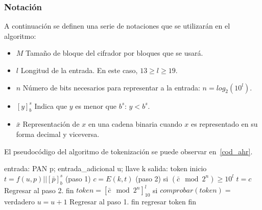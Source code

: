 \subsubsection{Notación}
A continuación se definen una serie de notaciones que se utilizarán en el
algoritmo:
\begin{itemize}
  \item $ M $ Tamaño de bloque del cifrador por bloques que se usará.
  \item $ l $ Longitud de la entrada. En este caso, $13 \geq l \geq 19$.
  \item $ n $ Número de bits necesarios para representar a la entrada:
    $n = log_2(10^l)$.
  \item $ [y]^s_b $ Indica que $y$ es menor que $b^s$: $y < b^s$.
  \item $\bar{x}$ Representación de $x$ en una cadena binaria cuando $x$ es
    representado en su forma decimal y viceversa.
\end{itemize}


El pseudocódigo del algoritmo de tokenización se puede observar en~\ref{cod_ahr}.
\begin{pseudocodigo}[%
    caption={Híbrido reversible, método de tokenización},
    label{cod_ahr}%
  ]
    entrada: PAN p; entrada_adicional u; llave k
    salida:  token
    inicio
      $t = f(u, p) || [\bar{p}]^s_b$ (paso 1)
      $c = E(k, t)$ (paso 2)
      si $(\bar{c} \mod 2^n) \geq 10^l$
        $t = c$
        Regresar al paso 2.
      fin
      $token = {[\bar{c} \mod 2^n]}^l_{10}$
      si $comprobar(token) =$ verdadero
        $u = u + 1$
        Regresar al paso 1.
      fin
      regresar token
    fin
\end{pseudocodigo}
